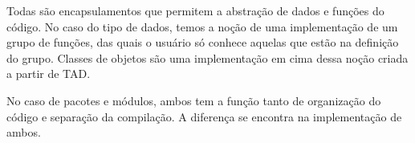 Todas são encapsulamentos que permitem a abstração de dados e funções do
código. No caso do tipo de dados, temos a noção de uma implementação de um
grupo de funções, das quais o usuário só conhece aquelas que estão na definição
do grupo. Classes de objetos são uma implementação em cima dessa noção criada a
partir de TAD.

No caso de pacotes e módulos, ambos tem a função tanto de organização do código
e separação da compilação. A diferença se encontra na implementação de ambos.